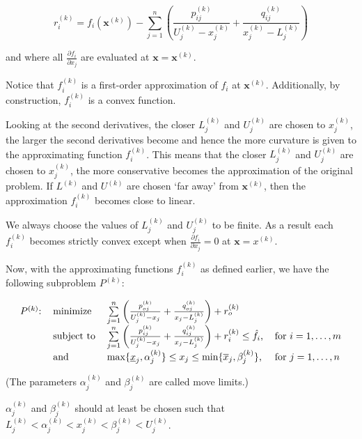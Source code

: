$$r_i^{(k)}=f_i(\mathbf{x}^{(k)})-\sum\limits_{j=1}^{n}\left(\frac{p_{ij}^{(k)}}{U_j^{(k)}-x_j^{(k)}}+\frac{q_{ij}^{(k)}}{x_j^{(k)}-L_j^{(k)}}\right)$$
	
\noindent and where all $\frac{\partial f_i}{\partial x_j}$ are evaluated at $\mathbf{x}=\mathbf{x}^{(k)}$.

Notice that $f_i^{(k)}$ is a first-order approximation of $f_i$ at $\mathbf{x}^{(k)}$. Additionally, by construction, $f_i^{(k)}$ is a convex function.

Looking at the second derivatives, the closer $L_j^{(k)}$ and $U_j^{(k)}$ are chosen to $x_j^{(k)}$, the larger the second derivatives become and hence the more curvature is given to the approximating function $f_i^{(k)}$. This means that the closer $L_j^{(k)}$ and $U_j^{(k)}$ are chosen to $x_j^{(k)}$, the more conservative becomes the approximation of the original problem. If $L^{(k)}$ and $U^{(k)}$ are chosen `far away' from $\mathbf{x}^{(k)}$, then the approximation $f_i^{(k)}$ becomes close to linear.

We always choose the values of $L_j^{(k)}$ and $U_j^{(k)}$ to be finite. As a result each $f_i^{(k)}$ becomes strictly convex except when $\frac{\partial f_i}{\partial x_j}=0$ at $\mathbf{x}=x^{(k)}$.

Now, with the approximating functions $f_i^{(k)}$ as defined earlier, we have the following subproblem $P^{(k)}$:

\begin{equation}
	\begin{tabular}{llll}
		$P^{(k)}$: & minimize   & $\sum\limits_{j=1}^{n}\left(\frac{p_{oj}^{(k)}}{U_j^{(k)}-x_j}+\frac{q_{oj}^{(k)}}{x_j-L_j^{(k)}}\right)+r_o^{(k)}$               &                    \\
		           & subject to & $\sum\limits_{j=1}^{n}\left(\frac{p_{ij}^{(k)}}{U_j^{(k)}-x_j}+\frac{q_{ij}^{(k)}}{x_j-L_j^{(k)}}\right)+r_i^{(k)}\leq\hat{f}_i$, & for $i=1,\ldots,m$ \\
		           & and        & $\max\lbrace\underline{x}_j,\alpha_j^{(k)}\rbrace\leq x_j\leq \min\lbrace \overline{x}_j,\beta_j^{(k)}\rbrace$,                   & for $j=1,\ldots,n$ 
	\end{tabular}
\end{equation}

(The parameters $\alpha_j^{(k)}$ and $\beta_j^{(k)}$ are called move limits.)

$\alpha_j^{(k)}$ and $\beta_j^{(k)}$ should at least be chosen such that $L_j^{(k)}<\alpha_j^{(k)}<x_j^{(k)}<\beta_j^{(k)}<U_j^{(k)}$.

